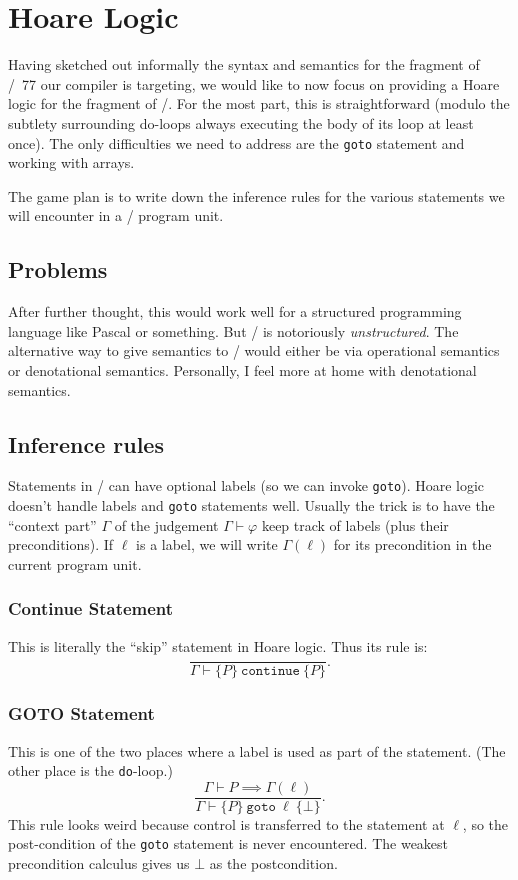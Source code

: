 \section{Hoare Logic}\label{section:hoare}
Having sketched out informally the syntax and semantics for the fragment
of \FORTRAN/~77 our compiler is targeting, we would like to now focus on
providing a Hoare logic for the fragment of \FORTRAN/. For the most
part, this is straightforward (modulo the subtlety surrounding do-loops
always executing the body of its loop at least once). The only
difficulties we need to address are the \texttt{goto} statement and
working with arrays.

The game plan is to write down the inference rules for the various
statements we will encounter in a \FORTRAN/ program unit.

\subsection{Problems}
After further thought, this would work well for a structured programming
language like Pascal or something. But \FORTRAN/ is notoriously
\emph{unstructured}. The alternative way to give semantics to \FORTRAN/
would either be via operational semantics or denotational semantics.
Personally, I feel more at home with denotational semantics.

\subsection{Inference rules}
Statements in \FORTRAN/ can have optional labels (so we can invoke
\texttt{goto}). Hoare logic doesn't handle labels and \texttt{goto}
statements well. Usually the trick is to have the ``context part'' $\Gamma$ of
the judgement $\Gamma\vdash\varphi$ keep track of labels (plus their
preconditions). If $\ell$ is a label, we will write $\Gamma(\ell)$ for
its precondition in the current program unit.

\subsubsection{Continue Statement}
This is literally the ``skip'' statement in Hoare logic. Thus its rule is:
\begin{equation}
\frac{}{\Gamma\vdash\{P\}~\mathtt{continue}~\{P\}}.
\end{equation}

\subsubsection{GOTO Statement}
This is one of the two places where a label is used as part of the
statement. (The other place is the \texttt{do}-loop.)
\begin{equation}
\frac{\Gamma\vdash P\implies\Gamma(\ell)}{\Gamma\vdash\{P\}~\mathtt{goto}~\ell~\{\bot\}}.
\end{equation}
This rule looks weird because control is transferred to the statement
at $\ell$, so the post-condition of the \texttt{goto} statement is never
encountered. The weakest precondition calculus gives us $\bot$ as the
postcondition.

